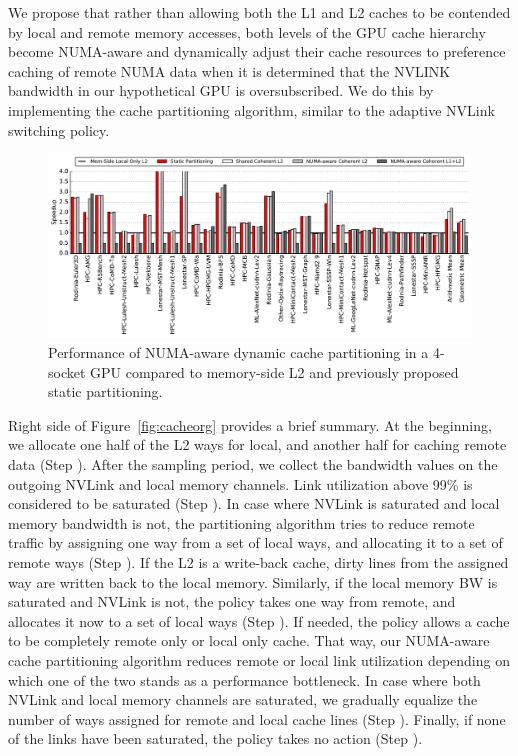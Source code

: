 We propose that rather than allowing both the L1 and L2 caches to be contended by local
and remote memory accesses,  both levels of the GPU cache hierarchy become NUMA-aware
and dynamically adjust their cache resources to preference caching of remote NUMA
data when it is determined that the NVLINK bandwidth in our hypothetical GPU is
oversubscribed.  We do this by implementing the cache partitioning
algorithm, similar to the adaptive NVLink switching policy.

\begin{figure}[t]
    \centering
    \includegraphics[width=1.0\textwidth]{figures/plot_merged_cache_WB.pdf}
    \caption{Performance of NUMA-aware dynamic cache partitioning in a 4-socket GPU compared to memory-side L2 and previously proposed static partitioning.}
    \label{fig:dynamiccaching}
\end{figure}

Right side of Figure~\ref{fig:cacheorg} provides a brief summary. At the beginning, 
we allocate one half of the L2 ways for local, and another half for caching 
remote data (Step ). After the sampling period, we collect the 
bandwidth values on the outgoing NVLink and local memory channels. Link 
utilization above 99\% is considered to be saturated (Step ). 
In case where NVLink is saturated and local memory bandwidth is not, the 
partitioning algorithm tries to reduce remote traffic by assigning one way 
from a set of local ways, and allocating it to a set of remote ways 
(Step ). If the L2 is a write-back cache, dirty lines from the 
assigned way are written back to the local memory. Similarly, if the local 
memory BW is saturated and NVLink is not, the policy takes one way from 
remote, and allocates it now to a set of local ways (Step ). 
If needed, the policy allows a cache to be completely remote only or local 
only cache. That way, our NUMA-aware cache partitioning algorithm reduces 
remote or local link utilization depending on which one of the two stands as 
a performance bottleneck. In case where both NVLink and local memory channels 
are saturated, we gradually equalize the number of ways assigned for remote 
and local cache lines (Step ). Finally, if none of the links have 
been saturated, the policy takes no action (Step ). 

